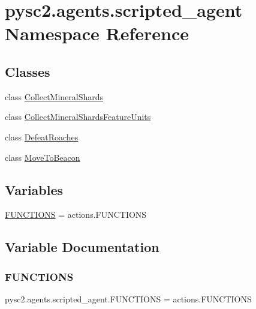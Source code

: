 \hypertarget{namespacepysc2_1_1agents_1_1scripted__agent}{}\section{pysc2.\+agents.\+scripted\+\_\+agent Namespace Reference}
\label{namespacepysc2_1_1agents_1_1scripted__agent}
\subsection*{Classes}
\begin{DoxyCompactItemize}
\item 
class \mbox{\hyperlink{classpysc2_1_1agents_1_1scripted__agent_1_1_collect_mineral_shards}{Collect\+Mineral\+Shards}}
\item 
class \mbox{\hyperlink{classpysc2_1_1agents_1_1scripted__agent_1_1_collect_mineral_shards_feature_units}{Collect\+Mineral\+Shards\+Feature\+Units}}
\item 
class \mbox{\hyperlink{classpysc2_1_1agents_1_1scripted__agent_1_1_defeat_roaches}{Defeat\+Roaches}}
\item 
class \mbox{\hyperlink{classpysc2_1_1agents_1_1scripted__agent_1_1_move_to_beacon}{Move\+To\+Beacon}}
\end{DoxyCompactItemize}
\subsection*{Variables}
\begin{DoxyCompactItemize}
\item 
\mbox{\hyperlink{namespacepysc2_1_1agents_1_1scripted__agent_ad8d2653e73869b6a677af4802071848a}{F\+U\+N\+C\+T\+I\+O\+NS}} = actions.\+F\+U\+N\+C\+T\+I\+O\+NS
\end{DoxyCompactItemize}


\subsection{Variable Documentation}
\mbox{\label{namespacepysc2_1_1agents_1_1scripted__agent_ad8d2653e73869b6a677af4802071848a}} 
\subsubsection{\texorpdfstring{F\+U\+N\+C\+T\+I\+O\+NS}{FUNCTIONS}}
{\footnotesize\ttfamily pysc2.\+agents.\+scripted\+\_\+agent.\+F\+U\+N\+C\+T\+I\+O\+NS = actions.\+F\+U\+N\+C\+T\+I\+O\+NS}

